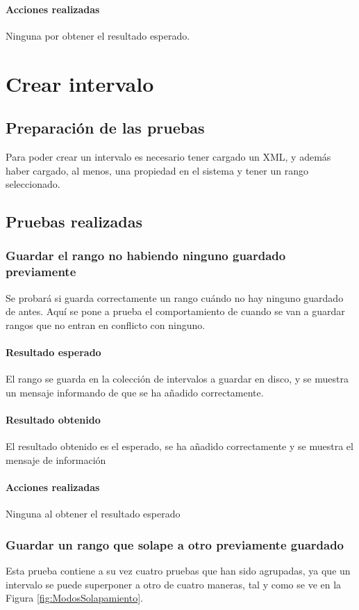 \paragraph{Acciones realizadas}
Ninguna por obtener el resultado esperado.

\section{Crear intervalo}
\subsection{Preparaci\'on de las pruebas}
Para poder crear un intervalo es necesario tener cargado un XML, y adem\'as haber cargado,
al menos, una propiedad en el sistema y tener un rango seleccionado.

\subsection{Pruebas realizadas}
\subsubsection{Guardar el rango no habiendo ninguno guardado previamente}
Se probar\'a si guarda correctamente un rango cu\'ando no hay ninguno guardado de antes.
Aqu\'i se pone a prueba el comportamiento de cuando se van a guardar rangos que no entran
en conflicto con ninguno.

\paragraph{Resultado esperado}
El rango se guarda en la colecci\'on de intervalos a guardar en disco, y se 
muestra un mensaje informando de que se ha a\~nadido correctamente.

\paragraph{Resultado obtenido}
El resultado obtenido es el esperado, se ha a\~nadido correctamente y se muestra
el mensaje de informaci\'on

\paragraph{Acciones realizadas}
Ninguna al obtener el resultado esperado

\subsubsection{Guardar un rango que solape a otro previamente guardado}
Esta prueba contiene a su vez cuatro pruebas que han sido agrupadas, ya que un intervalo
se puede superponer a otro de cuatro maneras, tal y como se ve en la Figura \ref{fig:ModosSolapamiento}.

